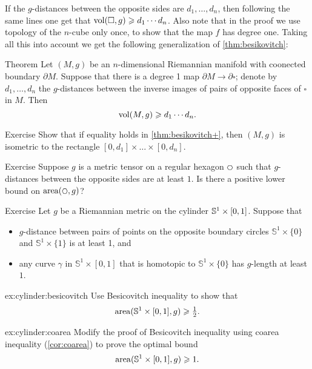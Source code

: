 If the $g$-distances between the opposite sides are $d_1,\dots ,d_n$, then following the same lines  one get that 
$\operatorname{\rm vol}\nolimits (\square,g)\geqslant d_1\cdots d_n$.
Also note that in the proof we use topology of the $n$-cube only once, to show that the map $f$ has degree one.
Taking all this into account we get the following generalization of \ref{thm:besikovitch}:

\begin{thm}{Theorem}\label{thm:besikovitch+}
Let $(M,g)$ be an $n$-dimensional Riemannian manifold with coonected boundary $\partial M$.
Suppose that there is a degree 1 map $\partial M\to \partial\square$;
denote by $d_1,\dots, d_n$ the $g$-distances between the inverse images of pairs of opposite faces of $\square$ in $M$.
Then 
\[\operatorname{\rm vol}\nolimits(M,g)\geqslant d_1\cdots d_n.\]

\end{thm}

\begin{thm}{Exercise}\label{ex:besikovitch=}
Show that if equality holds in \ref{thm:besikovitch+},
then $(M,g)$ is isometric to the rectangle $[0,d_1]\times\dots\times[0, d_n]$.
\end{thm}



\begin{thm}{Exercise}\label{ex:hexagon}
Suppose $g$ is a metric tensor on a regular hexagon $\text{\rm\hexagon}$ such that $g$-distances between the opposite sides are at least $1$.
Is there a positive lower bound on $\area(\text{\rm\hexagon},g)$?
\end{thm}

\begin{thm}{Exercise}\label{ex:cylinder}
Let $g$ be a Riemannian metric on the cylinder $\mathbb{S}^1\z\times [0,1]$.
Suppose that 
\begin{itemize}
\item 
$g$-distance between pairs of points on the opposite boundary circles $\mathbb{S}^1\times\{0\}$ and $\mathbb{S}^1\times\{1\}$ is at least 1, and 
\item
any curve $\gamma$ in $\mathbb{S}^1\times [0,1]$ that is homotopic to $\mathbb{S}^1\times\{0\}$ has $g$-length at least $1$.
\end{itemize}

\begin{subthm}{ex:cylinder:besicovitch}
Use Besicovitch inequality to show that
\[\operatorname{\rm area}\nolimits(\mathbb{S}^1\times [0,1],g)\geqslant \tfrac12.\]

\end{subthm}

\begin{subthm}{ex:cylinder:coarea}
Modify the proof of Besicovitch inequality using coarea inequality (\ref{cor:coarea}) to prove the optimal bound  
\[\operatorname{\rm area}\nolimits(\mathbb{S}^1\times [0,1],g)\geqslant 1.\]
 
\end{subthm}

\end{thm}

